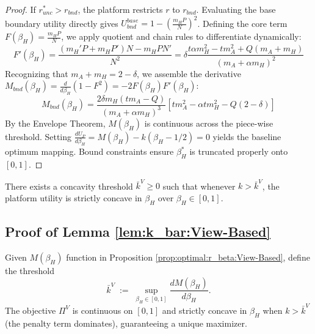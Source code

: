 \begin{proof}
If $r_{unc}^* > r_{bnd}$, the platform restricts $r$ to $r_{bnd}$. Evaluating the base boundary utility directly gives $U_{bnd}^{base} = 1 - \left(\frac{m_H P}{N}\right)^2$. Defining the core term $F(\beta_H) = \frac{m_H P}{N}$, we apply quotient and chain rules to differentiate dynamically:
\begin{equation*}
    F'(\beta_H) = \frac{(m_H' P + m_H P')N - m_H P N'}{N^2} = \delta \frac{t \alpha m_H^2 - t m_A^2 + Q(m_A + m_H)}{(m_A + \alpha m_H)^2}
\end{equation*}
Recognizing that $m_A + m_H = 2-\delta$, we assemble the derivative $M_{bnd}(\beta_H) = \frac{d}{d\beta_H} \left( 1 - F^2 \right) = -2 F(\beta_H) F'(\beta_H)$:
\begin{equation*}
    M_{bnd}(\beta_H) = \frac{2\delta m_H (t m_A - Q)}{(m_A + \alpha m_H)^3} \left[ t m_A^2 - \alpha t m_H^2 - Q(2-\delta) \right]
\end{equation*}
By the Envelope Theorem, $M(\beta_H)$ is continuous across the piece-wise threshold. Setting $\frac{dU_P}{d\beta_H} = M(\beta_H) - k(\beta_H - 1/2) = 0$ yields the baseline optimum mapping. Bound constraints ensure $\beta_H^*$ is truncated properly onto $[0, 1]$.
\end{proof}



\begin{lemma}\label{lem:k_bar:View-Based}
There exists a concavity threshold $\bar{k}^V\ge 0$ such that whenever $k>\bar{k}^V$, the platform utility is strictly concave in $\beta_H$ over $\beta_H \in [0,1]$.
\end{lemma}
\subsection*{Proof of Lemma \ref{lem:k_bar:View-Based}}
Given $M(\beta_H)$ function in Proposition \ref{prop:optimal:r_beta:View-Based}, define the threshold
\[
\bar{k}^{V} \;:=\; \sup_{\beta_H \in [0,1]} \frac{dM(\beta_H)}{d\beta_H}.
\] 
The objective $\Pi^{V}$ is continuous on $[0,1]$ and strictly concave in $\beta_H$ when $k > \bar{k}^{V}$ (the penalty term dominates), guaranteeing a unique maximizer.


